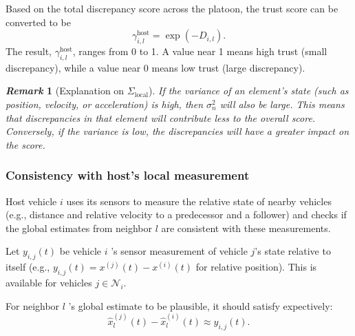 \documentclass[letterpaper, 10pt, conference]{ieeeconf}  %
\def\N{\mathcal{N}} %
\newtheorem{remark}{\it Remark}%
\begin{document}
Based on the total discrepancy score across the platoon, the trust score can be converted to be 
\begin{equation}
    \gamma_{i,l}^{\text{host}} = \exp\left( -{D_{i,l}} \right).
\end{equation}
The result,  $\gamma_{i,l}^{\text{host}}$, ranges from 0 to 1. A value near 1 means high trust (small discrepancy), while a value near 0 means low trust (large discrepancy).

\begin{remark}[Explanation on $\Sigma_{\text{local}}$]
If the variance of an element's state (such as position, velocity, or acceleration) is high, then \( \sigma^2_n \) will also be large. This means that discrepancies in that element will contribute less to the overall score. Conversely, if the variance is low, the discrepancies will have a greater impact on the score.
\end{remark}

\subsubsection{Consistency with host's local measurement}
Host vehicle  $i$  uses its sensors to measure the relative state of nearby vehicles (e.g., distance and relative velocity to a predecessor and a follower) and checks if the global estimates from neighbor  $l$  are consistent with these measurements.

Let $y_{i,j}(t)$ be vehicle  $i$ 's sensor measurement of vehicle $ j $'s state relative to itself (e.g., $ y_{i,j}(t) = x^{(j)}(t) - x^{(i)}(t) $ for relative position). This is available for vehicles $ j \in \N_i$. 

For neighbor $l$ 's global estimate to be plausible, it should satisfy expectively:
\begin{equation*}
    \hat{x}_l^{(j)}(t) - \hat{x}_l^{(i)}(t) \approx y_{i,j}(t).
\end{equation*}
\end{document}
